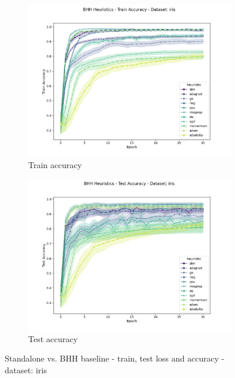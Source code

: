\begin{figure}[htbp]
	\begin{subfigure}{0.5\textwidth}
    	\centering
        \includegraphics[width=\textwidth]{analysis/standalone/figures/train/accuracy/iris.png}
        \caption{Train accuracy}
        \label{fig:results:standalone:figures:accuracy:train:iris}
	\end{subfigure}
	\begin{subfigure}{0.5\textwidth}
    	\centering
        \includegraphics[width=\textwidth]{analysis/standalone/figures/test/accuracy/iris.png}
        \caption{Test accuracy}
        \label{fig:results:standalone:figures:accuracy:test:iris}
	\end{subfigure}
	\par\bigskip
	\caption{Standalone vs. \Acs{BHH} baseline - train, test loss and accuracy - dataset: iris}
	\label{fig:results:standalone:figures:iris}
\end{figure}


